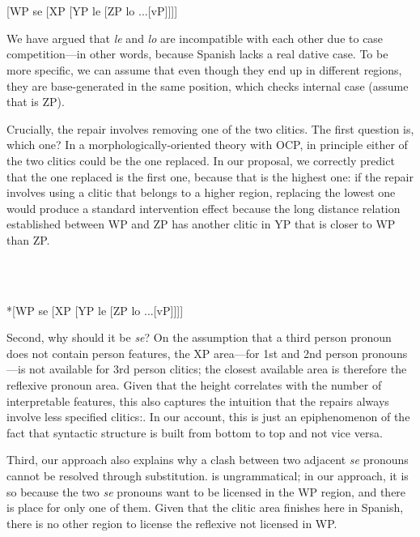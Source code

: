 \documentclass[output=paper,modfonts,nonflat]{langsci/langscibook}
\begin{document}
\ea%
    \label{ex:key:23}
    \gll\\
        \\
    \glt
    \z

         [WP  se  [XP   [YP  le  [ZP  lo ...[vP]]]]

We have argued that \textit{le} and \textit{lo} are incompatible with each other due to case competition—in other words, because Spanish lacks a real dative case. To be more specific, we can assume that even though they end up in different regions, they are base-generated in the same position, which checks internal case (assume that is ZP). 

Crucially, the repair involves removing one of the two clitics. The first question is, which one? In a morphologically-oriented theory with OCP, in principle either of the two clitics could be the one replaced. In our proposal, we correctly predict that the one replaced is the first one, because that is the highest one: if the repair involves using a clitic that belongs to a higher region, replacing the lowest one would produce a standard intervention effect because the long distance relation established between WP and ZP has another clitic in YP that is closer to WP than ZP.

\ea%
    \label{ex:key:24}
    \gll\\
        \\
    \glt
    \z

          *[WP   se  [XP  [YP  le  [ZP  lo ...[vP]]]]

Second, why should it be \textit{se}? On the assumption that a third person pronoun does not contain person features, the XP area—for 1st and 2nd person pronouns—is not available for 3rd person clitics; the closest available area is therefore the reflexive pronoun area. Given that the height correlates with the number of interpretable features, this also captures the intuition that the repairs always involve less specified clitics:. In our account, this is just an epiphenomenon of the fact that syntactic structure is built from bottom to top and not vice versa.

Third, our approach also explains why a clash between two adjacent \textit{se} pronouns cannot be resolved through substitution.  is ungrammatical; in our approach, it is so because the two \textit{se} pronouns want to be licensed in the WP region, and there is place for only one of them. Given that the clitic area finishes here in Spanish, there is no other region to license the reflexive not licensed in WP.
\end{document}
